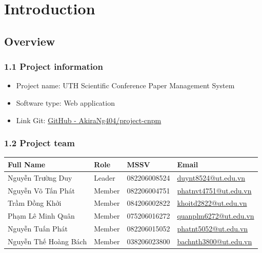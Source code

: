 \chapter{Introduction}

\section{Overview}

\subsection*{1.1 Project information}
\begin{itemize}
	\item Project name: UTH Scientific Conference Paper Management System
	\item Software type: Web application
	\item Link Git: \href{https://github.com/AkiraNg404/project-cnpm}{GitHub - AkiraNg404/project-cnpm}
\end{itemize}

\subsection*{1.2 Project team}

\begin{table}[h!]
	\centering
	\begin{tabular}{|p{3.5cm}|p{2cm}|p{3cm}|p{4cm}|}
		\hline
		\textbf{Full Name} & \textbf{Role} & \textbf{MSSV} & \textbf{Email} \\
		\hline
		Nguyễn Trường Duy & Leader & 082206008524 & \href{mailto:duynt8524@ut.edu.vn}{duynt8524@ut.edu.vn} \\
		\hline
		Nguyễn Võ Tấn Phát & Member & 082206004751 & \href{mailto:phatnvt4751@ut.edu.vn}{phatnvt4751@ut.edu.vn} \\
		\hline
		Trầm Đồng Khởi & Member & 084206002822 & \href{mailto:khoitd2822@ut.edu.vn}{khoitd2822@ut.edu.vn} \\
		\hline
		Phạm Lê Minh Quân & Member & 075206016272 & \href{mailto:quanplm6272@ut.edu.vn}{quanplm6272@ut.edu.vn} \\
		\hline
		Nguyễn Tuấn Phát & Member & 082206015052 & \href{mailto:phatnt5052@ut.edu.vn}{phatnt5052@ut.edu.vn} \\
		\hline
		Nguyễn Thế Hoàng Bách & Member & 038206023800 & \href{mailto:bachnth3800@ut.edu.vn}{bachnth3800@ut.edu.vn} \\
		\hline
	\end{tabular}
\end{table}